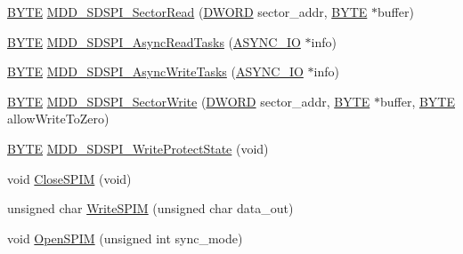 \begin{DoxyCompactItemize}
\item 
\hyperlink{_generic_type_defs_8h_a4ae1dab0fb4b072a66584546209e7d58}{B\+Y\+T\+E} \hyperlink{_s_d-_s_p_i_8c_a36e18542755f672a02b549ba9d9a5b3d}{M\+D\+D\+\_\+\+S\+D\+S\+P\+I\+\_\+\+Sector\+Read} (\hyperlink{_generic_type_defs_8h_ad342ac907eb044443153a22f964bf0af}{D\+W\+O\+R\+D} sector\+\_\+addr, \hyperlink{_generic_type_defs_8h_a4ae1dab0fb4b072a66584546209e7d58}{B\+Y\+T\+E} $\ast$buffer)
\item 
\hyperlink{_generic_type_defs_8h_a4ae1dab0fb4b072a66584546209e7d58}{B\+Y\+T\+E} \hyperlink{_s_d-_s_p_i_8c_aa23a73d4e8ad01a7431a1f09195be6e9}{M\+D\+D\+\_\+\+S\+D\+S\+P\+I\+\_\+\+Async\+Read\+Tasks} (\hyperlink{struct_a_s_y_n_c___i_o}{A\+S\+Y\+N\+C\+\_\+\+I\+O} $\ast$info)
\item 
\hyperlink{_generic_type_defs_8h_a4ae1dab0fb4b072a66584546209e7d58}{B\+Y\+T\+E} \hyperlink{_s_d-_s_p_i_8c_a020ed7ef9ebcf7dce1002ef668c2a32e}{M\+D\+D\+\_\+\+S\+D\+S\+P\+I\+\_\+\+Async\+Write\+Tasks} (\hyperlink{struct_a_s_y_n_c___i_o}{A\+S\+Y\+N\+C\+\_\+\+I\+O} $\ast$info)
\item 
\hyperlink{_generic_type_defs_8h_a4ae1dab0fb4b072a66584546209e7d58}{B\+Y\+T\+E} \hyperlink{_s_d-_s_p_i_8c_a1d6db29d5e24aebec87110db1ca5823d}{M\+D\+D\+\_\+\+S\+D\+S\+P\+I\+\_\+\+Sector\+Write} (\hyperlink{_generic_type_defs_8h_ad342ac907eb044443153a22f964bf0af}{D\+W\+O\+R\+D} sector\+\_\+addr, \hyperlink{_generic_type_defs_8h_a4ae1dab0fb4b072a66584546209e7d58}{B\+Y\+T\+E} $\ast$buffer, \hyperlink{_generic_type_defs_8h_a4ae1dab0fb4b072a66584546209e7d58}{B\+Y\+T\+E} allow\+Write\+To\+Zero)
\item 
\hyperlink{_generic_type_defs_8h_a4ae1dab0fb4b072a66584546209e7d58}{B\+Y\+T\+E} \hyperlink{_s_d-_s_p_i_8c_a27a3238b87bb45f8d37c958982ace55e}{M\+D\+D\+\_\+\+S\+D\+S\+P\+I\+\_\+\+Write\+Protect\+State} (void)
\item 
void \hyperlink{_s_d-_s_p_i_8c_a046824de7bd39b019b942d8ef3643546}{Close\+S\+P\+I\+M} (void)
\item 
unsigned char \hyperlink{_s_d-_s_p_i_8c_ab4e7f228a81fb435b37e82b99fb27bb5}{Write\+S\+P\+I\+M} (unsigned char data\+\_\+out)
\item 
void \hyperlink{_s_d-_s_p_i_8c_a7c6595aec33f6c0757dc30133f3a1646}{Open\+S\+P\+I\+M} (unsigned int sync\+\_\+mode)
\end{DoxyCompactItemize}
